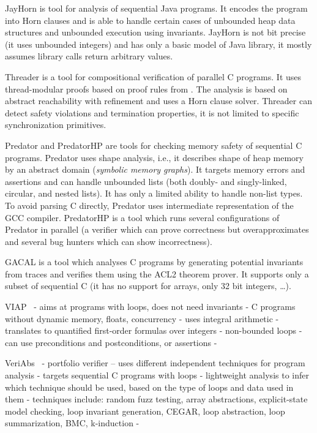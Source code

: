 JayHorn  is tool for analysis of sequential Java programs.
It encodes the program into Horn clauses and is able to handle certain cases of unbounded heap data structures and unbounded execution using invariants.
JayHorn is not bit precise (it uses unbounded integers) and has only a basic model of Java library, it mostly assumes library calls return arbitrary values.

Threader  is a tool for compositional verification of parallel C programs.
It uses thread-modular proofs based on proof rules from .
The analysis is based on abstract reachability with refinement and uses a Horn clause solver.
Threader can detect safety violations and termination properties, it is not limited to specific synchronization primitives.

Predator and PredatorHP  are tools for checking memory safety of sequential C programs.
Predator uses shape analysis, i.e., it describes shape of heap memory by an abstract domain (\emph{symbolic memory graphs}).
It targets memory errors and assertions and can handle unbounded lists (both doubly- and singly-linked, circular, and nested lists).
It has only a limited ability to handle non-list types.
To avoid parsing C directly, Predator uses intermediate representation of the GCC compiler.
PredatorHP is a tool which runs several configurations of Predator in parallel (a verifier which can prove correctness but overapproximates and several bug hunters which can show incorrectness).

GACAL  is a tool which analyses C programs by generating potential invariants from traces and verifies them using the ACL2 theorem prover.
It supports only a subset of sequential C (it has no support for arrays, only 32 bit integers, …). 

VIAP~
- aims at programs with loops, does not need invariants
- C programs without dynamic memory, floats, concurrency
- uses integral arithmetic
- translates to quantified first-order formulas over integers
- non-bounded loops
- can use preconditions and postconditions, or assertions
- 

VeriAbs~
- portfolio verifier -- uses different independent techniques for program analysis
- targets sequential C programs with loops
- lightweight analysis to infer which technique should be used, based on the type of loops and data used in them
- techniques include: random fuzz testing, array abstractions, explicit-state model checking, loop invariant generation, CEGAR, loop abstraction, loop summarization, BMC, k-induction
- 

